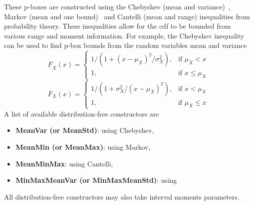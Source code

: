 \documentclass{juliacon}
\begin{document}
These p-boxes are constructed using the Chebyshev (mean and variance)~\cite{chebyshev1874valeurs}, Markov (mean and one bound)~\cite{markoff1900question} and Cantelli (mean and range) inequalities from probability theory. These inequalities allow for the cdf to be bounded from various range and moment information. For example, the Chebyshev inequality can be used to find p-box bounds from the random variables mean and variance
\begin{equation*}
  \underline{F}_{X}(x) = \begin{cases} 1 / (1 + (x - \mu_{X})^2 / \sigma^{2}_{X}),& \text{if } \mu_{X}<x \\
    1,& \text{if } x\leq \mu_{X} \end{cases}
\end{equation*}
\begin{equation*}
  \overline{F}_{X}(x)  = \begin{cases} 1 / (1 + \sigma^{2}_{X}/(x - \mu_{X})^2),& \text{if } x<\mu_{X} \\
  1,& \text{if } \mu_{X}\leq x \end{cases}
\end{equation*}
\noindent A list of available distribution-free constructors are
\begin{itemize}
  \item \textbf{MeanVar (or MeanStd)}: using Chebyshev,
  \item \textbf{MeanMin (or MeanMax)}: using Markov,
  \item \textbf{MeanMinMax}: using Cantelli,
  \item \textbf{MinMaxMeanVar (or MinMaxMeanStd)}: using~\cite{ferson2021distribution}
\end{itemize}
\noindent All distribution-free constructors may also take interval moments parameters.
\end{document}
